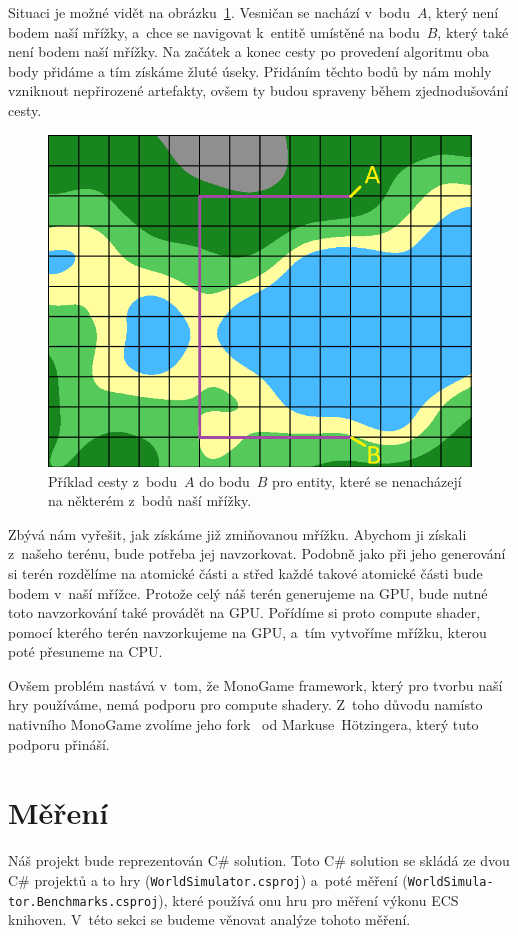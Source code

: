 Situaci je možné vidět na obrázku~\ref{fig:path_end_points}. Vesničan se nachází v~bodu~$A$, který není bodem naší mřížky, a~chce se navigovat k~entitě umístěné na bodu~$B$, který také není bodem naší mřížky. Na začátek a konec cesty po provedení algoritmu oba body přidáme a tím získáme žluté úseky. Přidáním těchto bodů by nám mohly vzniknout nepřirozené artefakty, ovšem ty budou spraveny během zjednodušování cesty.

\begin{figure}[!htb]
    \centering
    \includegraphics[width=0.66\linewidth]{img/path_end_points.png}
    \caption{Příklad cesty z~bodu~$A$ do bodu~$B$ pro entity, které se nenacházejí na některém z~bodů naší mřížky.}
    \label{fig:path_end_points}
\end{figure}

Zbývá nám vyřešit, jak získáme již zmiňovanou mřížku. Abychom ji získali z~našeho terénu, bude potřeba jej navzorkovat. Podobně jako při jeho generování si terén rozdělíme na atomické části a střed každé takové atomické části bude bodem v~naší mřížce. Protože celý náš terén generujeme na GPU, bude nutné toto navzorkování také provádět na GPU. Pořídíme si proto compute shader, pomocí kterého terén navzorkujeme na GPU, a~tím vytvoříme mřížku, kterou poté přesuneme na CPU.

Ovšem problém nastává v~tom, že MonoGame framework, který pro tvorbu naší hry používáme, nemá podporu pro compute shadery. Z~toho důvodu namísto nativního MonoGame zvolíme jeho fork~\cite{MonoGameCptMax} od Markuse~Hötzingera, který tuto podporu přináší.

\section{Měření}
\label{benchmark-analysis}
Náš projekt bude reprezentován C\# solution. Toto C\# solution se skládá ze dvou C\# projektů a to hry (\texttt{WorldSimulator.csproj}) a~poté měření (\texttt{WorldSimula-} \texttt{tor.Benchmarks.csproj}), které používá onu hru pro měření výkonu ECS knihoven. V~této sekci se budeme věnovat analýze tohoto měření.

